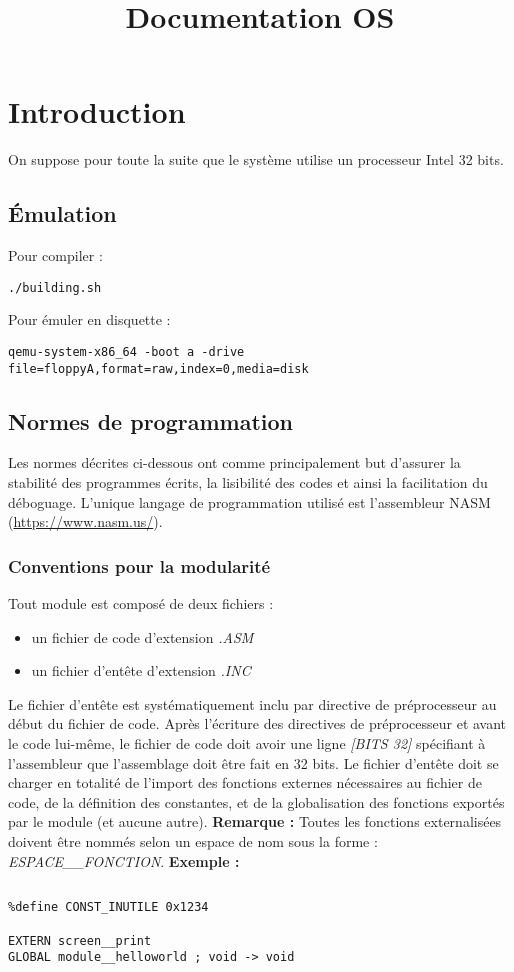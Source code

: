 \documentclass{book}
\newcommand*{\jumpline}{\newline \newline}
\begin{document}
\title{Documentation OS}
\maketitle
\chapter{Introduction}
On suppose pour toute la suite que le système utilise un processeur Intel 32 bits.
\section{Émulation}
Pour compiler :
\begin{verbatim}
./building.sh
\end{verbatim}
Pour émuler en disquette :
\begin{verbatim}
qemu-system-x86_64 -boot a -drive file=floppyA,format=raw,index=0,media=disk
\end{verbatim}
\section{Normes de programmation}
Les normes décrites ci-dessous ont comme principalement but d'assurer la stabilité des programmes écrits, la lisibilité des codes et ainsi la facilitation du déboguage.
\jumpline 
L'unique langage de programmation utilisé est l'assembleur NASM (\url{https://www.nasm.us/}).
\subsection{Conventions pour la modularité}
Tout module est composé de deux fichiers :
\begin{itemize}
	\item un fichier de code d'extension \textit{.ASM}
	\item un fichier d'entête d'extension \textit{.INC}
\end{itemize}
Le fichier d'entête est systématiquement inclu par directive de préprocesseur au début du fichier de code.
Après l'écriture des directives de préprocesseur et avant le code lui-même, le fichier de code doit avoir une ligne \textit{[BITS 32]} spécifiant à l'assembleur que l'assemblage doit être fait en 32 bits.
\jumpline
Le fichier d'entête doit se charger en totalité de l'import des fonctions externes nécessaires au fichier de code, de la définition des constantes, et de la globalisation des fonctions exportés par le module (et aucune autre).
\jumpline
\textbf{Remarque :} Toutes les fonctions externalisées doivent être nommés selon un espace de nom sous la forme : \textit{ESPACE\_\_FONCTION}.
\jumpline
\textbf{Exemple : }
\begin{lstlisting}[title=module.inc]
\end{lstlisting}
\begin{verbatim}
%define CONST_INUTILE 0x1234

EXTERN screen__print
GLOBAL module__helloworld ; void -> void
\end{verbatim}
\end{document}
